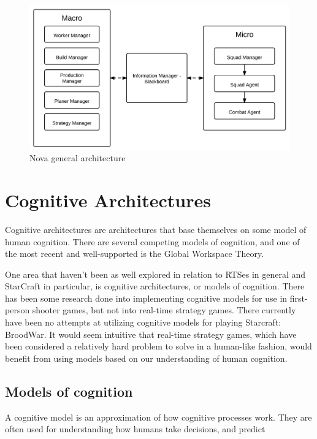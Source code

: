 
\begin{figure}[h!tbp]
\centering
\includegraphics[scale=0.8]{graphics/nova.png}
\caption{Nova general architecture}
\label{fig:bthaiarch}
\end{figure}

\section{Cognitive Architectures}
Cognitive architectures are architectures that base themselves on some model of
human cognition. There are several competing models of cognition, and one of
the most recent and well-supported is the Global Workspace Theory.


One area that haven't been as well explored in relation to RTSes in general and
StarCraft in particular, is cognitive architectures, or models of cognition.
There has been some research done into implementing cognitive models for use in
first-person shooter games, but not into real-time strategy games. There
currently have been no attempts at utilizing cognitive models for playing
Starcraft: BroodWar. It would seem intuitive that real-time strategy games,
which have been considered a relatively hard problem to solve in a human-like
fashion, would benefit from using models based on our understanding of human
cognition.

\subsection{Models of cognition}
A cognitive model is an approximation of how cognitive processes work. They are
often used for understanding how humans take decisions, and predict 

